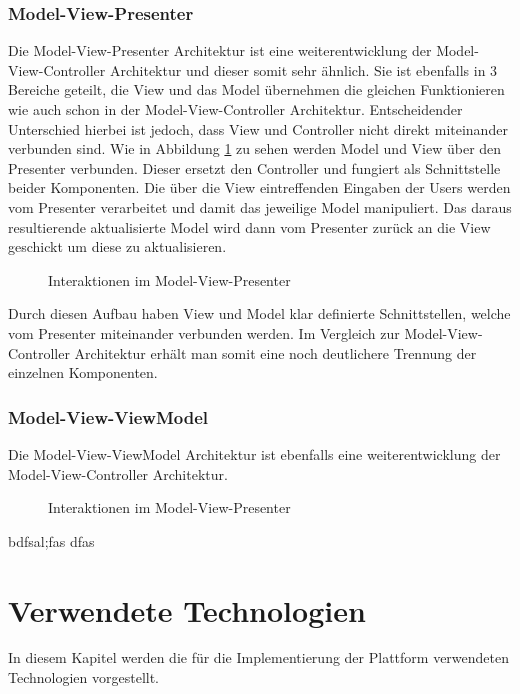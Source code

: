    \subsection{Model-View-Presenter}\label{subsec:model-view-presenter}
    Die Model-View-Presenter Architektur ist eine weiterentwicklung der Model-View-Controller Architektur und dieser somit sehr ähnlich.
    Sie ist ebenfalls in 3 Bereiche geteilt, die View und das Model übernehmen die gleichen Funktionieren wie auch schon in der Model-View-Controller Architektur.
    Entscheidender Unterschied hierbei ist jedoch, dass View und Controller nicht direkt miteinander verbunden sind.
    Wie in Abbildung \ref{fig:mvp} zu sehen werden Model und View über den Presenter verbunden.
    Dieser ersetzt den Controller und fungiert als Schnittstelle beider Komponenten.
    Die über die View eintreffenden Eingaben der Users werden vom Presenter verarbeitet und damit das jeweilige Model manipuliert.
    Das daraus resultierende aktualisierte Model wird dann vom Presenter zurück an die View geschickt um diese zu aktualisieren.~\cite{mvp1}
    \begin{figure}[h]
        \centering
        
        \caption{Interaktionen im Model-View-Presenter}
        \label{fig:mvp}
    \end{figure}

    Durch diesen Aufbau haben View und Model klar definierte Schnittstellen, welche vom Presenter miteinander verbunden werden.
    Im Vergleich zur Model-View-Controller Architektur erhält man somit eine noch deutlichere Trennung der einzelnen Komponenten.~\cite{mvp2}

    \subsection{Model-View-ViewModel}\label{subsec:model-view-viewmodel}
    Die Model-View-ViewModel Architektur ist ebenfalls eine weiterentwicklung der Model-View-Controller Architektur.


    \begin{figure}[h]
        \centering
        
        \caption{Interaktionen im Model-View-Presenter}
        \label{fig:mvvm}
    \end{figure}


    bdfsal;fas dfas


    \chapter{Verwendete Technologien}\label{ch:verwendete-technologien}
    In diesem Kapitel werden die für die Implementierung der Plattform verwendeten Technologien vorgestellt.



